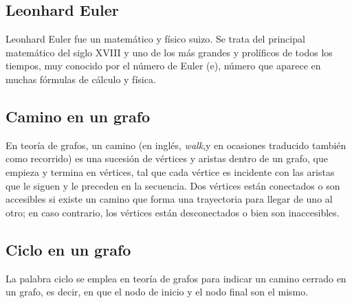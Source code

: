 \subsection{Leonhard Euler}
Leonhard Euler fue un matemático y físico suizo. Se trata del principal matemático del siglo XVIII y uno de los más grandes y prolíficos de todos los tiempos, muy conocido por el número de Euler (e), número que aparece en muchas fórmulas de cálculo y física.

\subsection{Camino en un grafo}
En teoría de grafos, un camino (en inglés, \emph{walk},y en ocasiones traducido también como recorrido) es una sucesión de vértices y aristas dentro de un grafo, que empieza y termina en vértices, tal que 
cada vértice es incidente con las aristas que le siguen y le preceden en la secuencia. Dos vértices están
conectados o son accesibles si existe un camino que forma una trayectoria para llegar de uno al otro; en
caso contrario, los vértices están desconectados o bien son inaccesibles.

\subsection{Ciclo en un grafo}
La palabra ciclo se emplea en teoría de grafos para indicar un camino cerrado en un grafo, es decir, en que el nodo de inicio y el nodo final son el mismo.
